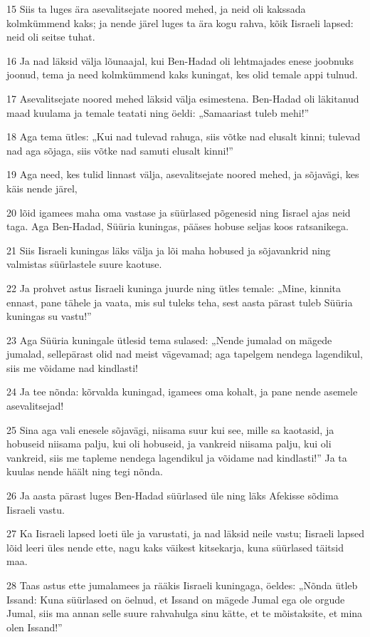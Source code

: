 \par 15 Siis ta luges ära asevalitsejate noored mehed, ja neid oli kakssada kolmkümmend kaks; ja nende järel luges ta ära kogu rahva, kõik Iisraeli lapsed: neid oli seitse tuhat.
\par 16 Ja nad läksid välja lõunaajal, kui Ben-Hadad oli lehtmajades enese joobnuks joonud, tema ja need kolmkümmend kaks kuningat, kes olid temale appi tulnud.
\par 17 Asevalitsejate noored mehed läksid välja esimestena. Ben-Hadad oli läkitanud maad kuulama ja temale teatati ning öeldi: „Samaariast tuleb mehi!”
\par 18 Aga tema ütles: „Kui nad tulevad rahuga, siis võtke nad elusalt kinni; tulevad nad aga sõjaga, siis võtke nad samuti elusalt kinni!”
\par 19 Aga need, kes tulid linnast välja, asevalitsejate noored mehed, ja sõjavägi, kes käis nende järel,
\par 20 lõid igamees maha oma vastase ja süürlased põgenesid ning Iisrael ajas neid taga. Aga Ben-Hadad, Süüria kuningas, pääses hobuse seljas koos ratsanikega.
\par 21 Siis Iisraeli kuningas läks välja ja lõi maha hobused ja sõjavankrid ning valmistas süürlastele suure kaotuse.
\par 22 Ja prohvet astus Iisraeli kuninga juurde ning ütles temale: „Mine, kinnita ennast, pane tähele ja vaata, mis sul tuleks teha, sest aasta pärast tuleb Süüria kuningas su vastu!”
\par 23 Aga Süüria kuningale ütlesid tema sulased: „Nende jumalad on mägede jumalad, sellepärast olid nad meist vägevamad; aga tapelgem nendega lagendikul, siis me võidame nad kindlasti!
\par 24 Ja tee nõnda: kõrvalda kuningad, igamees oma kohalt, ja pane nende asemele asevalitsejad!
\par 25 Sina aga vali enesele sõjavägi, niisama suur kui see, mille sa kaotasid, ja hobuseid niisama palju, kui oli hobuseid, ja vankreid niisama palju, kui oli vankreid, siis me tapleme nendega lagendikul ja võidame nad kindlasti!” Ja ta kuulas nende häält ning tegi nõnda.
\par 26 Ja aasta pärast luges Ben-Hadad süürlased üle ning läks Afekisse sõdima Iisraeli vastu.
\par 27 Ka Iisraeli lapsed loeti üle ja varustati, ja nad läksid neile vastu; Iisraeli lapsed lõid leeri üles nende ette, nagu kaks väikest kitsekarja, kuna süürlased täitsid maa.
\par 28 Taas astus ette jumalamees ja rääkis Iisraeli kuningaga, öeldes: „Nõnda ütleb Issand: Kuna süürlased on öelnud, et Issand on mägede Jumal ega ole orgude Jumal, siis ma annan selle suure rahvahulga sinu kätte, et te mõistaksite, et mina olen Issand!”
